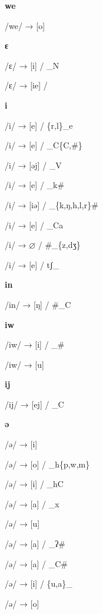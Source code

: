 \begin{center}\textbf{we}\end{center}
\begin{multicols}{4}
\noindent /we/ → [o]
\end{multicols}


\begin{center}\textbf{ɛ}\end{center}
\begin{multicols}{4}
\noindent /ɛ/ → [i] / \_N

\noindent /ɛ/ → [ie] /
\end{multicols}


\begin{center}\textbf{i}\end{center}
\begin{multicols}{4}
\noindent /i/ → [e] / \{r,l\}\_e

\noindent /i/ → [e] / \_C\{C,\#\}

\noindent /i/ → [əj] / \_V

\noindent /i/ → [e] / \_k\#

\noindent /i/ → [iə] / \_\{k,ŋ,h,l,r\}\#

\noindent /i/ → [e] / \_Ca

\noindent /i/ → $\varnothing$ / \#\_\{z,dʒ\}

\noindent /i/ → [e] / tʃ\_
\end{multicols}


\begin{center}\textbf{in}\end{center}
\begin{multicols}{4}
\noindent /in/ → [ŋ] / \#\_C
\end{multicols}


\begin{center}\textbf{iw}\end{center}
\begin{multicols}{4}
\noindent /iw/ → [i] / \_\#

\noindent /iw/ → [u]
\end{multicols}


\begin{center}\textbf{ij}\end{center}
\begin{multicols}{4}
\noindent /ij/ → [ej] / \_C
\end{multicols}


\begin{center}\textbf{ə}\end{center}
\begin{multicols}{4}
\noindent /ə/ → [i]

\noindent /ə/ → [o] / \_h\{p,w,m\}

\noindent /ə/ → [i] / \_hC

\noindent /ə/ → [a] / \_x

\noindent /ə/ → [u]

\noindent /ə/ → [a] / \_ʔ\#

\noindent /ə/ → [a] / \_C\#

\noindent /ə/ → [i] / \{u,a\}\_

\noindent /ə/ → [o]
\end{multicols}


